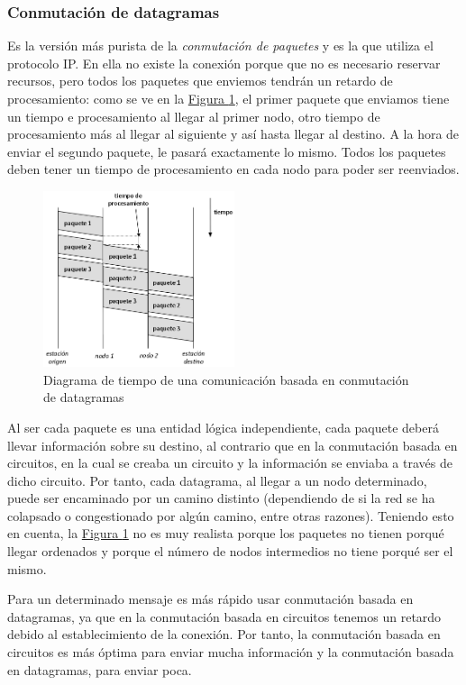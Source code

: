 \documentclass[10pt,a4paper,spanish]{report}
\begin{document}
\subsubsection{\textcolor{tema4}Conmutación de datagramas}
Es la versión más purista de la \textit{\textcolor{tema4}{conmutación de paquetes}} y es la que utiliza el protocolo IP. En ella no existe la conexión porque que no es necesario reservar recursos, pero todos los paquetes que enviemos tendrán un retardo de procesamiento: como se ve en la \hyperref[condat]{Figura \ref*{condat}}, el primer paquete que enviamos tiene un tiempo e procesamiento al llegar al primer nodo, otro tiempo de procesamiento más al llegar al siguiente y así hasta llegar al destino. A la hora de enviar el segundo paquete, le pasará exactamente lo mismo. Todos los paquetes deben tener un tiempo de procesamiento en cada nodo para poder ser reenviados. 

\begin{figure}[!h]
  \centering
  \includegraphics[width=0.5\textwidth]{condat}
  \caption{Diagrama de tiempo de una comunicación basada en conmutación de datagramas}
  \label{condat}
\end{figure}

Al ser cada paquete es una entidad lógica independiente, cada paquete deberá llevar información sobre su destino, al contrario que en la conmutación basada en circuitos, en la cual se creaba un circuito y la información se enviaba a través de dicho circuito. Por tanto, cada datagrama, al llegar a un nodo determinado, puede ser encaminado por un camino distinto (dependiendo de si la red se ha colapsado o congestionado por algún camino, entre otras razones). Teniendo esto en cuenta, la \hyperref[condat]{Figura \ref*{condat}} no es muy realista porque los paquetes no tienen porqué llegar ordenados y porque el número de nodos intermedios no tiene porqué ser el mismo.

Para un determinado mensaje es más rápido usar conmutación basada en datagramas, ya que en la conmutación basada en circuitos tenemos un retardo debido al establecimiento de la conexión. Por tanto, la conmutación basada en circuitos es más óptima para enviar mucha información y la conmutación basada en datagramas, para enviar poca.
\end{document}
